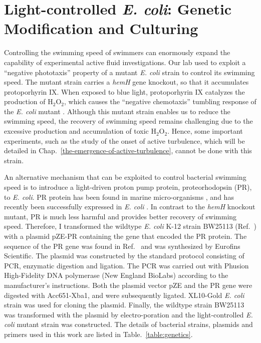 \section{Light-controlled \textit{E. coli}: Genetic Modification and Culturing}
\label{light-controlled-E-coli-genetic-modification-culturing-and-trouble-shooting}
Controlling the swimming speed of swimmers can enormously expand the capability of experimental active fluid investigations. Our lab used to exploit a ``negative phototaxis'' property of a mutant \textit{E. coli} strain to control its swimming speed. The mutant strain carries a \textit{hemH} gene knockout, so that it accumulates protoporhyrin IX. When exposed to blue light, protoporhyrin IX catalyzes the production of H$_2$O$_2$, which causes the ``negative chemotaxis'' tumbling response of the \textit{E. coli} mutant \cite{Yang1995}. Although this mutant strain enables us to reduce the swimming speed, the recovery of swimming speed remains challenging due to the excessive production and accumulation of toxic H$_2$O$_2$. Hence, some important experiments, such as the study of the onset of active turbulence, which will be detailed in Chap.~\ref{the-emergence-of-active-turbulence}, cannot be done with this strain.

An alternative mechanism that can be exploited to control bacterial swimming speed is to introduce a light-driven proton pump protein, proteorhodopsin (PR), to \textit{E. coli}. PR protein has been found in marine micro-organisms \cite{Beja2000, DelaTorre2003}, and has recently been successfully expressed in \textit{E. coli} \cite{Walter2007}. In contrast to the \textit{hemH} knockout mutant, PR is much less harmful and provides better recovery of swimming speed. Therefore, I transformed the wildtype \textit{E. coli} K-12 strain BW25113 (Ref.~\cite{Datsenko2000}) with a plasmid pZE-PR containing the gene that encoded the PR protein. The sequence of the PR gene was found in Ref.~\cite{DelaTorre2003} and was synthesized by Eurofins Scientific.
The plasmid was constructed by the standard protocol consisting of PCR, enzymatic digestion and ligation. The PCR was carried out with Phusion High-Fidelity DNA polymerase (New England BioLabs) according to the manufacturer's instructions. Both the plasmid vector pZE and the PR gene were digested with Acc651-Xba1, and were subsequently ligated. XL10-Gold \textit{E. coli} strain was used for cloning the plasmid. Finally, the wildtype strain BW25113 was transformed with the plasmid by electro-poration and the light-controlled \textit{E. coli} mutant strain was constructed. The details of bacterial strains, plasmids and primers used in this work are listed in Table.~\ref{table:genetics}.

